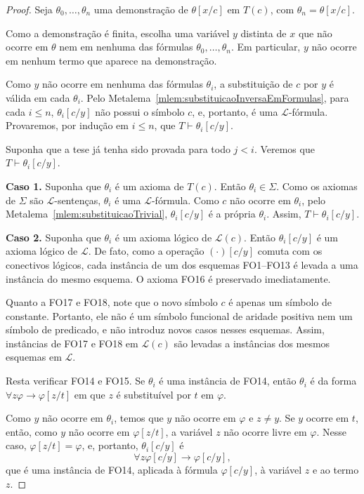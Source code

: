 \begin{proof}
    Seja $\theta_0,\dots,\theta_n$ uma demonstração de $\theta[x/c]$ em $T(c)$, com $\theta_n=\theta[x/c]$.

    Como a demonstração é finita, escolha uma variável $y$ distinta de $x$ que não ocorre em $\theta$ nem em nenhuma das fórmulas $\theta_0,\dots,\theta_n$.
    Em particular, $y$ não ocorre em nenhum termo que aparece na demonstração.

    Como $y$ não ocorre em nenhuma das fórmulas $\theta_i$, a substituição de $c$ por $y$ é válida em cada $\theta_i$.
    Pelo Metalema~\ref{mlem:substituicaoInversaEmFormulas}, para cada $i\leq n$, $\theta_i[c/y]$ não possui o símbolo $c$, e, portanto, é uma $\mathcal L$-fórmula.
    Provaremos, por indução em $i\leq n$, que $T\vdash \theta_i[c/y]$.

    Suponha que a tese já tenha sido provada para todo $j<i$.
    Veremos que $T\vdash \theta_i[c/y]$.

    \textbf{Caso 1.} Suponha que $\theta_i$ é um axioma de $T(c)$.
    Então $\theta_i\in\Sigma$.
    Como os axiomas de $\Sigma$ são $\mathcal L$-sentenças, $\theta_i$ é uma $\mathcal L$-fórmula.
    Como $c$ não ocorre em $\theta_i$, pelo Metalema~\ref{mlem:substituicaoTrivial}, $\theta_i[c/y]$ é a própria $\theta_i$.
    Assim, $T\vdash \theta_i[c/y]$.

    \textbf{Caso 2.} Suponha que $\theta_i$ é um axioma lógico de $\mathcal L(c)$.
    Então $\theta_i[c/y]$ é um axioma lógico de $\mathcal L$.
    De fato, como a operação $(\cdot)[c/y]$ comuta com os conectivos lógicos, cada instância de um dos esquemas FO1--FO13 é levada a uma instância do mesmo esquema.
    O axioma FO16 é preservado imediatamente.

    Quanto a FO17 e FO18, note que o novo símbolo $c$ é apenas um símbolo de constante.
    Portanto, ele não é um símbolo funcional de aridade positiva nem um símbolo de predicado, e não introduz novos casos nesses esquemas.
    Assim, instâncias de FO17 e FO18 em $\mathcal L(c)$ são levadas a instâncias dos mesmos esquemas em $\mathcal L$.

    Resta verificar FO14 e FO15.
    Se $\theta_i$ é uma instância de FO14, então $\theta_i$ é da forma $\forall z\varphi\rightarrow\varphi[z/t]$ em que $z$ é substituível por $t$ em $\varphi$.

    Como $y$ não ocorre em $\theta_i$, temos que $y$ não ocorre em $\varphi$ e $z\neq y$.
    Se $y$ ocorre em $t$, então, como $y$ não ocorre em $\varphi[z/t]$, a variável $z$ não ocorre livre em $\varphi$.
    Nesse caso, $\varphi[z/t]=\varphi$, e, portanto, $\theta_i[c/y]$ é
    \[
        \forall z\varphi[c/y]\rightarrow\varphi[c/y],
    \]
    que é uma instância de FO14, aplicada à fórmula $\varphi[c/y]$, à variável $z$ e ao termo $z$.


\end{proof}
